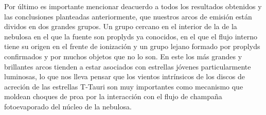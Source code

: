 Por último es importante mencionar deacuerdo a todos los resultados obtenidos y las conclusiones planteadas anteriormente, que nuestros arcos de emisión están dividos en dos grandes grupos. Un grupo cercano en el interior de la de la nebulosa en el que la fuente son proplyds ya conocidos, en el que el flujo interno tiene su origen en el frente de  ionización y un grupo lejano formado por proplyds confirmados y por muchos objetos que no lo son. En este los más grandes y brillantes arcos tienden a estar asociados con estrellas jóvenes particularmente luminosas, lo que nos lleva pensar que los vientos intrínsicos de los discos de acreción de las estrellas T-Tauri son muy importantes como mecanismo que moldean  choques de proa por la  interacción con el flujo de champaña fotoevaporado del núcleo de la nebulosa.  

 
%